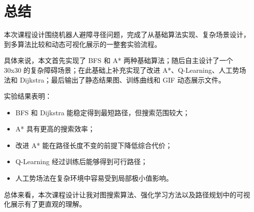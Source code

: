 \chapter{总结}\label{chap:summary}

本次课程设计围绕机器人避障寻径问题，完成了从基础算法实现、复杂场景设计，到多算法比较和动态可视化展示的一整套实验流程。

具体来说，本文首先实现了 BFS 和 A* 两种基础算法；随后自主设计了一个 30x30 的复杂障碍场景；在此基础上补充实现了改进 A*、Q-Learning、人工势场法和 Dijkstra；最后输出了静态结果图、训练曲线和 GIF 动态展示文件。

实验结果表明：
\begin{itemize}
  \item BFS 和 Dijkstra 能稳定得到最短路径，但搜索范围较大；
  \item A* 具有更高的搜索效率；
  \item 改进 A* 能在路径长度不变的前提下降低综合代价；
  \item Q-Learning 经过训练后能够得到可行路径；
  \item 人工势场法在复杂环境中容易受到局部极小值影响。
\end{itemize}

总体来看，本次课程设计让我对图搜索算法、强化学习方法以及路径规划中的可视化展示有了更直观的理解。
